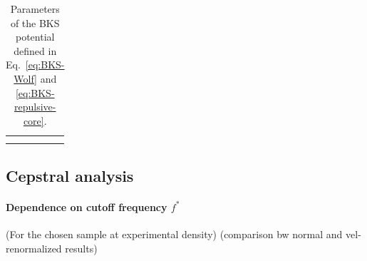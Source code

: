 \begin{table}[!htb]
    \centering
    \begin{tabular}{c|c}
         &  \\
         & 
    \end{tabular}
    \caption{Parameters of the BKS potential defined in Eq.~\eqref{eq:BKS-Wolf} and \eqref{eq:BKS-repulsive-core}.}
    \label{tab:BKS-table}
\end{table}


\subsection{Cepstral analysis}
\paragraph{Dependence on cutoff frequency $f^*$}
(For the chosen sample at experimental density)
(comparison bw normal and vel-renormalized results)

